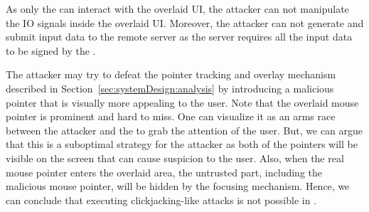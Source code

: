 
 As only the \device can interact with the overlaid UI, the attacker can not manipulate the IO signals inside the overlaid UI. Moreover, the attacker can not generate and submit input data to the remote server as the server requires all the input data to be signed by the \device.

The attacker may try to defeat the \name pointer tracking and overlay mechanism described in Section~\ref{sec:systemDesign:analysis} by introducing a malicious pointer that is visually more appealing to the user. Note that the \device overlaid mouse pointer is prominent and hard to miss. One can visualize it as an arms race between the attacker and the \device to grab the attention of the user. But, we can argue that this is a suboptimal strategy for the attacker as both of the pointers will be visible on the screen that can cause suspicion to the user. Also, when the real mouse pointer enters the overlaid area, the untrusted part, including the malicious mouse pointer, will be hidden by the focusing mechanism. Hence, we can conclude that executing clickjacking-like attacks is not possible in \name.


